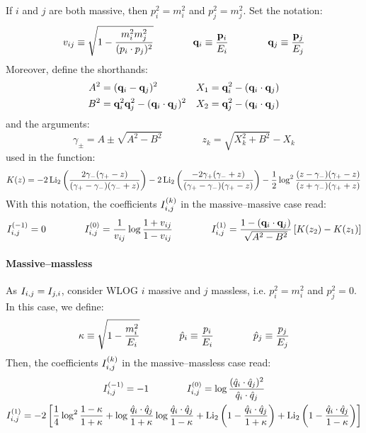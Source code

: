 If $ i $ and $ j $ are both massive, then $ p_i^2 = m_i^2 $ and $ p_j^2 = m_j^2 $. Set the notation:
\begin{equation}
  v_{ij} \equiv \sqrt{1 - \frac{m_i^2 m_j^2}{(p_i \cdot p_j)^2}}
  \qquad \qquad
  \mathbf{q}_i \equiv \frac{\mathbf{p}_i}{E_i}
  \qquad \qquad
  \mathbf{q}_j \equiv \frac{\mathbf{p}_j}{E_j}
  \label{eq:v-def}
\end{equation}
Moreover, define the shorthands:
\begin{align*}
  A^2 &= (\mathbf{q}_i - \mathbf{q}_j)^2 & X_1 &= \mathbf{q}_i^2 - (\mathbf{q}_i \cdot \mathbf{q}_j) \\
  B^2 &= \mathbf{q}_i^2 \mathbf{q}_j^2 - (\mathbf{q}_i \cdot \mathbf{q}_j)^2 & X_2 &= \mathbf{q}_j^2 - (\mathbf{q}_i \cdot \mathbf{q}_j)
\end{align*}
and the arguments:
\begin{equation*}
  \gamma_{\pm} = A \pm \sqrt{A^2 - B^2}
  \qquad \qquad
  z_k = \sqrt{X_k^2 + B^2} - X_k
\end{equation*}
used in the function:
\begin{equation*}
  K(z) = - 2 \operatorname{Li_2} \left( \frac{2\gamma_- (\gamma_+ - z)}{(\gamma_+ - \gamma_-) (\gamma_- + z)} \right) - 2 \operatorname{Li_2} \left( \frac{-2\gamma_+(\gamma_- + z)}{(\gamma_+ - \gamma_-) (\gamma_+ - z)} \right) - \frac{1}{2} \log^2 \frac{(z - \gamma_-) (\gamma_+ - z)}{(z + \gamma_-) (\gamma_+ + z)}
\end{equation*}
With this notation, the coefficients $ I_{i,j}^{(k)} $ in the massive--massive case read:
\begin{equation}
  I_{i,j}^{(-1)} = 0
  \qquad \qquad
  I_{i,j}^{(0)} = \frac{1}{v_{ij}} \log \frac{1 + v_{ij}}{1 - v_{ij}}
  \qquad \qquad
  I_{i,j}^{(1)} = \frac{1 - (\mathbf{q}_i \cdot \mathbf{q}_j)}{\sqrt{A^2 - B^2}} \left[ K(z_2) - K(z_1) \right]
\end{equation}

\paragraph{Massive--massless}

As $ I_{i,j} = I_{j,i} $, consider WLOG $ i $ massive and $ j $ massless, i.e. $ p_i^2 = m_i^2 $ and $ p_j^2 = 0 $. In this case, we define:
\begin{equation}
  \kappa \equiv \sqrt{1 - \frac{m_i^2}{E_i}}
  \qquad \qquad
  \hat{p}_i \equiv \frac{p_i}{E_i}
  \qquad \qquad
  \hat{p}_j \equiv \frac{p_j}{E_j}
  \label{eq:kappa-def}
\end{equation}
Then, the coefficients $ I_{i,j}^{(k)} $ in the massive--massless case read:
\begin{equation}
  \begin{gathered}
    I_{i,j}^{(-1)} = -1
    \qquad \qquad
    I_{i,j}^{(0)} = \log \frac{(\hat{q}_i \cdot \hat{q}_j)^2}{\hat{q}_i \cdot \hat{q}_j}
    \\
    I_{i,j}^{(1)} = -2 \left[ \frac{1}{4} \log^2 \frac{1 - \kappa}{1 + \kappa} + \log \frac{\hat{q}_i \cdot \hat{q}_j}{1 + \kappa} \log \frac{\hat{q}_i \cdot \hat{q}_j}{1 - \kappa} + \operatorname{Li_2} \left( 1 - \frac{\hat{q}_i \cdot \hat{q}_j}{1 + \kappa} \right) + \operatorname{Li_2} \left( 1 - \frac{\hat{q}_i \cdot \hat{q}_j}{1 - \kappa} \right) \right]
  \end{gathered}
\end{equation}

